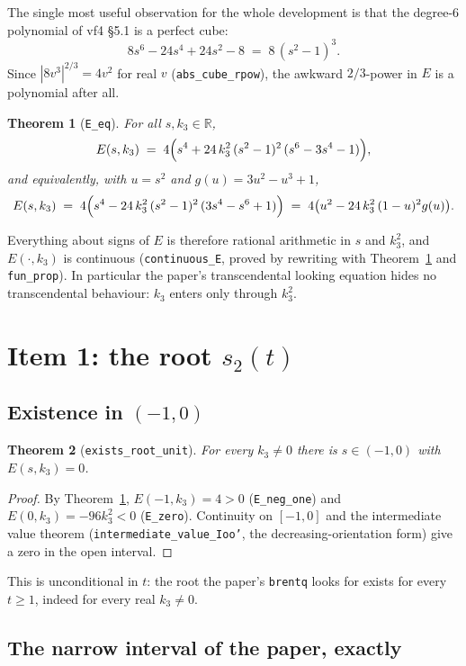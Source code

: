 \documentclass[11pt,a4paper]{article}
\newcommand{\R}{\mathbb{R}}
\newcommand{\lb}{\_\allowbreak}
\newcommand{\code}[1]{\texttt{#1}}
\newtheorem{theorem}{Theorem}[section]
\theoremstyle{definition}
\theoremstyle{remark}
\begin{document}
The single most useful observation for the whole development is that the degree-6
polynomial of vf4 \S5.1 is a perfect cube:
\begin{equation}\label{eq:cube}
  8s^6-24s^4+24s^2-8 \;=\; 8\,(s^2-1)^3 .
\end{equation}
Since $|8v^3|^{2/3}=4v^2$ for real $v$ (\code{abs\lb cube\lb rpow}), the awkward
$2/3$-power in $E$ is a polynomial after all.

\begin{theorem}[\code{E\lb eq}]\label{thm:Eeq}
For all $s,k_3\in\R$,
\[
  E(s,k_3) \;=\; 4\Bigl(s^4+24\,k_3^2\,(s^2-1)^2\,(s^6-3s^4-1)\Bigr),
\]
and equivalently, with $u=s^2$ and $g(u)=3u^2-u^3+1$,
\[
  E(s,k_3) \;=\; 4\Bigl(s^4-24\,k_3^2\,(s^2-1)^2\,(3s^4-s^6+1)\Bigr)
  \;=\; 4\bigl(u^2-24\,k_3^2\,(1-u)^2 g(u)\bigr).
\]
\end{theorem}

Everything about signs of $E$ is therefore rational arithmetic in $s$ and $k_3^2$, and
$E(\cdot,k_3)$ is continuous (\code{continuous\lb E}, proved by rewriting with
Theorem~\ref{thm:Eeq} and \code{fun\lb prop}).  In particular the paper's transcendental
looking equation hides no transcendental behaviour: $k_3$ enters only through $k_3^2$.

\section{Item 1: the root $s_2(t)$}\label{sec:item1}

\subsection{Existence in $(-1,0)$}

\begin{theorem}[\code{exists\lb root\lb unit}]
For every $k_3\neq0$ there is $s\in(-1,0)$ with $E(s,k_3)=0$.
\end{theorem}
\begin{proof}
By Theorem~\ref{thm:Eeq}, $E(-1,k_3)=4>0$ (\code{E\lb neg\lb one}) and
$E(0,k_3)=-96k_3^2<0$ (\code{E\lb zero}).  Continuity on $[-1,0]$ and the intermediate
value theorem (\code{intermediate\lb value\lb Ioo'}, the decreasing-orientation form) give a
zero in the open interval.
\end{proof}

This is unconditional in $t$: the root the paper's \code{brentq} looks for exists for every
$t\ge1$, indeed for every real $k_3\neq0$.

\subsection{The narrow interval of the paper, exactly}
\end{document}
